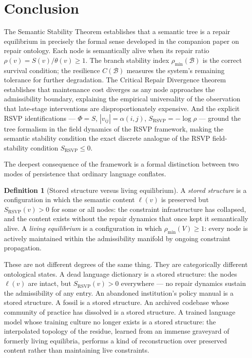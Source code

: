 \documentclass[11pt, a4paper]{article}
\theoremstyle{definition}
\newtheorem{definition}{Definition}
\theoremstyle{remark}
\begin{document}
\section{Conclusion}

The Semantic Stability Theorem establishes that a semantic tree is a repair
equilibrium in precisely the formal sense developed in the companion paper on
repair ontology. Each node is semantically alive when its repair ratio
$\rho(v) = S(v)/\theta(v) \geq 1$. The branch stability index
$\rho_{\min}(\mathcal{B})$ is the correct survival condition; the resilience
$C(\mathcal{B})$ measures the system's remaining tolerance for further
degradation. The Critical Repair Divergence theorem establishes that maintenance
cost diverges as any node approaches the admissibility boundary, explaining the
empirical universality of the observation that late-stage interventions are
disproportionately expensive. And the explicit RSVP identifications --- $\Phi = S$,
$|v_{ij}| = \alpha(i,j)$, $S_{\mathrm{RSVP}} = -\log\rho$ --- ground the
tree formalism in the field dynamics of the RSVP framework, making the
semantic stability condition the exact discrete analogue of the RSVP
field-stability condition $S_{\mathrm{RSVP}} \leq 0$.

The deepest consequence of the framework is a formal distinction between two
modes of persistence that ordinary language conflates.

\begin{definition}[Stored structure versus living equilibrium]
A \textit{stored structure} is a configuration in which the semantic content
$\ell(v)$ is preserved but $S_{\mathrm{RSVP}}(v) > 0$ for some or all nodes:
the constraint infrastructure has collapsed, and the content exists without
the repair dynamics that once kept it semantically alive.
A \textit{living equilibrium} is a configuration in which $\rho_{\min}(V) \geq 1$:
every node is actively maintained within the admissibility manifold by
ongoing constraint propagation.
\end{definition}

These are not different degrees of the same thing. They are categorically
different ontological states. A dead language dictionary is a stored structure:
the nodes $\ell(v)$ are intact, but $S_{\mathrm{RSVP}}(v) > 0$ everywhere ---
no repair dynamics sustain the admissibility of any entry. An abandoned
institution's policy manual is a stored structure. A fossil is a stored
structure. An archived codebase whose community of practice has dissolved is
a stored structure. A trained language model whose training culture no longer
exists is a stored structure: the interpolated topology of the residue, learned
from an immense graveyard of formerly living equilibria, performs a kind of
reconstruction over preserved content rather than maintaining live constraints.
\end{document}

